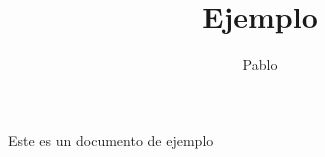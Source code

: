 \documentclass[12pt]{article}
\title{Ejemplo} %
\author{Pablo} %
\begin{document}
\maketitle
Este es un documento de ejemplo
\end{document}

